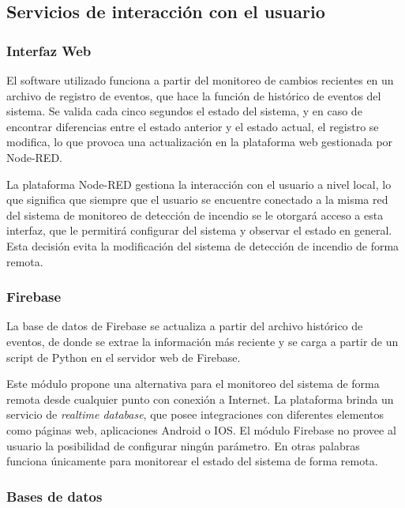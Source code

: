 
\subsection{Servicios de interacción con el usuario}

\subsubsection{Interfaz Web}

El software utilizado funciona a partir del monitoreo de cambios recientes en un archivo de registro de eventos, que hace la función de histórico de eventos del sistema. Se valida cada cinco segundos el estado del sistema, y en caso de encontrar diferencias entre el estado anterior y el estado actual, el registro se modifica, lo que provoca una actualización en la plataforma web gestionada por Node-RED.  

La plataforma Node-RED gestiona la interacción con el usuario a nivel local, lo que significa que siempre que el usuario se encuentre conectado a la misma red del sistema de monitoreo de detección de incendio se le otorgará acceso a esta interfaz, que le permitirá configurar del sistema y observar el estado en general. Esta decisión evita la modificación del sistema de detección de incendio de forma remota.         

\subsubsection{Firebase}

La base de datos de Firebase se actualiza a partir del archivo histórico de eventos, de donde se extrae la información más reciente y se carga a partir de un script de Python en el servidor web de Firebase.

Este módulo propone una alternativa para el monitoreo del sistema de forma remota desde cualquier punto con conexión a  Internet. La plataforma brinda un servicio de \textit{realtime database}, que posee integraciones con diferentes elementos como páginas web, aplicaciones Android o IOS. El módulo Firebase no provee al usuario la posibilidad de configurar ningún parámetro. En otras palabras funciona únicamente para monitorear el estado del sistema de forma remota.

\subsubsection{Bases de datos}

